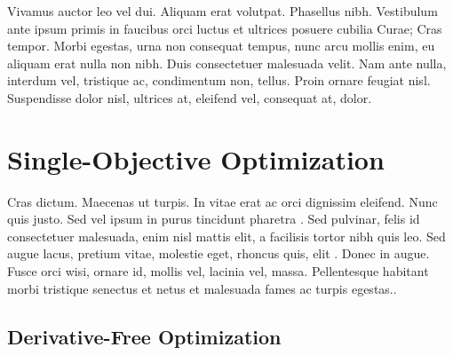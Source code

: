 \cleardoublepage
\label{chap:back}

Vivamus auctor leo vel dui. Aliquam erat volutpat. Phasellus nibh. Vestibulum ante ipsum primis in faucibus orci luctus et ultrices posuere cubilia Curae; Cras tempor. Morbi egestas, urna non consequat tempus, nunc arcu mollis enim, eu aliquam erat nulla non nibh. Duis consectetuer malesuada velit. Nam ante nulla, interdum vel, tristique ac, condimentum non, tellus. Proin ornare feugiat nisl. Suspendisse dolor nisl, ultrices at, eleifend vel, consequat at, dolor.
\section{Single-Objective Optimization}
Cras dictum. Maecenas ut turpis. In vitae erat ac orci dignissim eleifend. Nunc quis justo. Sed vel ipsum in purus tincidunt pharetra \cite{MacAulay:2005fk}. Sed pulvinar, felis id consectetuer malesuada, enim nisl mattis elit, a facilisis tortor nibh quis leo. Sed augue lacus, pretium vitae, molestie eget, rhoncus quis, elit \cite{Schwarz:2007lr}. Donec in augue. Fusce orci wisi, ornare id, mollis vel, lacinia vel, massa. Pellentesque habitant morbi tristique senectus et netus et malesuada fames ac turpis egestas..

\subsection{Derivative-Free Optimization}

